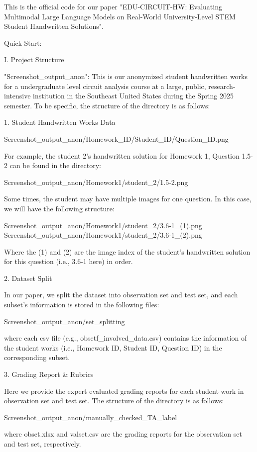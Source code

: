 This is the official code for our paper "EDU-CIRCUIT-HW: Evaluating Multimodal Large Language Models on Real-World University-Level STEM Student Handwritten Solutions".

Quick Start:

I. Project Structure

"Screenshot_output_anon": This is our anonymized student handwritten works for a undergraduate level circuit analysis course at a large, public, research-intensive institution in the Southeast United States during the Spring 2025 semester. To be specific, the structure of the directory is as follows:

1. Student Handwritten Works Data

Screenshot_output_anon/Homework_ID/Student_ID/Question_ID.png

For example, the student 2's handwritten solution for Homework 1, Question 1.5-2 can be found in the directory:

Screenshot_output_anon/Homework1/student_2/1.5-2.png

Some times, the student may have multiple images for one question. In this case, we will have the following structure:

Screenshot_output_anon/Homework1/student_2/3.6-1_(1).png
Screenshot_output_anon/Homework1/student_2/3.6-1_(2).png

Where the (1) and (2) are the image index of the student's handwritten solution for this question (i.e., 3.6-1 here) in order.

2. Dataset Split

In our paper, we split the dataset into observation set and test set, and each subset's information is stored in the following files:

Screenshot_output_anon/set_splitting

where each csv file (e.g., obsetf_involved_data.csv) contains the information of the student works (i.e., Homework ID, Student ID, Question ID) in the corresponding subset.

3. Grading Report & Rubrics

Here we provide the expert evaluated grading reports for each student work in observation set and test set. The structure of the directory is as follows:

Screenshot_output_anon/manually_checked_TA_label

where obset.xlsx and valset.csv are the grading reports for the observation set and test set, respectively.


